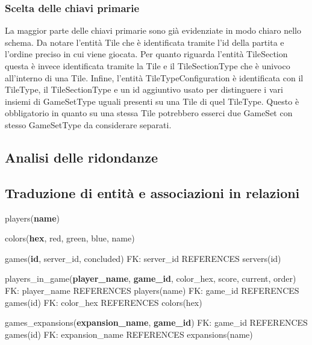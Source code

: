 \medskip
\subsubsection*{Scelta delle chiavi primarie}
La maggior parte delle chiavi primarie sono già evidenziate in modo chiaro nello schema. Da notare l'entità Tile che è identificata tramite l'id della partita e l'ordine preciso in cui viene giocata. Per quanto riguarda l'entità TileSection questa è invece identificata tramite la Tile e il TileSectionType che è univoco all'interno di una Tile. Infine, l'entità TileTypeConfiguration è identificata con il TileType, il TileSectionType e un id aggiuntivo usato per distinguere i vari insiemi di GameSetType uguali presenti su una Tile di quel TileType. Questo è obbligatorio in quanto su una stessa Tile potrebbero esserci due GameSet con stesso GameSetType da considerare separati.

\subsection{Analisi delle ridondanze}

\subsection{Traduzione di entità e associazioni in relazioni}
\hspace{1.5em}players(\textbf{name})\newline

colors(\textbf{hex}, red, green, blue, name)\newline

games(\textbf{id}, server\_id, concluded)\newline
FK: server\_id REFERENCES servers(id)\newline

players\_in\_game(\textbf{player\_name}, \textbf{game\_id}, color\_hex, score, current, order)\newline
FK: player\_name REFERENCES players(name)\newline
FK: game\_id REFERENCES games(id)\newline
FK: color\_hex REFERENCES colors(hex)\newline

games\_expansions(\textbf{expansion\_name}, \textbf{game\_id})\newline
FK: game\_id REFERENCES games(id)\newline
FK: expansion\_name REFERENCES expansions(name)\newline

